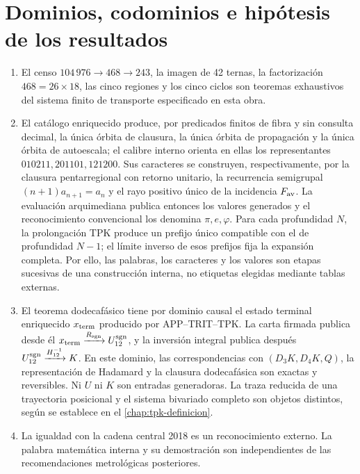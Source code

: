 \chapter{Dominios, codominios e hipótesis de los resultados}
\label{app:premisas}

\begin{enumerate}
\item El censo \(104\,976\to468\to243\), la imagen de 42 ternas, la
factorización \(468=26\times18\), las cinco regiones y los cinco ciclos son
teoremas exhaustivos del sistema finito de transporte especificado en esta
obra.

\item El catálogo enriquecido produce, por predicados finitos de fibra y sin
consulta decimal, la única órbita de clausura, la única órbita de
propagación y la única órbita de autoescala; el calibre interno orienta en
ellas los representantes \(010211,201101,121200\). Sus caracteres se
construyen, respectivamente, por la clausura pentarregional con retorno
unitario, la recurrencia semigrupal \((n+1)a_{n+1}=a_n\) y el rayo positivo
único de la incidencia \(F_{\rm av}\). La evaluación arquimediana publica
entonces los valores generados y el reconocimiento convencional los denomina
\(\pi,e,\varphi\). Para cada profundidad \(N\), la prolongación TPK produce
un prefijo único compatible con el de profundidad \(N-1\); el límite
inverso de esos prefijos fija la expansión completa. Por ello, las palabras,
los caracteres y los valores son etapas sucesivas de una construcción
interna, no etiquetas elegidas mediante tablas externas.

\item El teorema dodecafásico tiene por dominio causal el estado terminal
enriquecido \(x_{\rm term}\) producido por APP--TRIT--TPK. La carta firmada
publica desde él
\(x_{\rm term}\xrightarrow{R_{\rm sgn}}U_{12}^{\rm sgn}\), y la inversión
integral publica después
\(U_{12}^{\rm sgn}\xrightarrow{\mathcal H_{12}^{-1}}K\). En este dominio,
las correspondencias con \((D_3K,D_4K,Q)\), la representación de Hadamard y
la clausura dodecafásica son exactas y reversibles. Ni \(U\) ni \(K\) son
entradas generadoras. La traza reducida de una trayectoria posicional y el
sistema bivariado completo son objetos distintos, según se establece en el
\cref{chap:tpk-definicion}.

\item La igualdad con la cadena central 2018 es un reconocimiento externo.
La palabra matemática interna y su demostración son independientes de las
recomendaciones metrológicas posteriores.


\end{enumerate}
